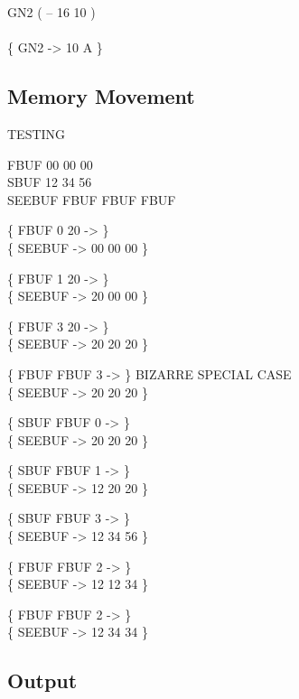 \begin{tt}
\word{:} GN2	 ( -- 16 10 ) \\
\tab {}  
	  
	  
	  \word{!} \word{;} \\
\{ GN2 -> 10 A \}
\end{tt}

\subsection{Memory Movement}

\begin{tt}
TESTING  

 FBUF 00  00  00  \\
 SBUF 12  34  56  \\
\word{:} SEEBUF FBUF   FBUF    FBUF    \word{;}

\{ FBUF 0 20  -> \} \\
\{ SEEBUF -> 00 00 00 \}

\{ FBUF 1 20  -> \} \\
\{ SEEBUF -> 20 00 00 \}

\{ FBUF 3 20  -> \} \\
\{ SEEBUF -> 20 20 20 \}

\{ FBUF FBUF 3   -> \} \tab[3]  BIZARRE SPECIAL CASE \\
\{ SEEBUF -> 20 20 20 \}

\{ SBUF FBUF 0   -> \} \\
\{ SEEBUF -> 20 20 20 \}

\{ SBUF FBUF 1   -> \} \\
\{ SEEBUF -> 12 20 20 \}

\{ SBUF FBUF 3   -> \} \\
\{ SEEBUF -> 12 34 56 \}

\{ FBUF FBUF  2   -> \} \\
\{ SEEBUF -> 12 12 34 \}

\{ FBUF  FBUF 2   -> \} \\
\{ SEEBUF -> 12 34 34 \}
\end{tt}

\subsection{Output}

